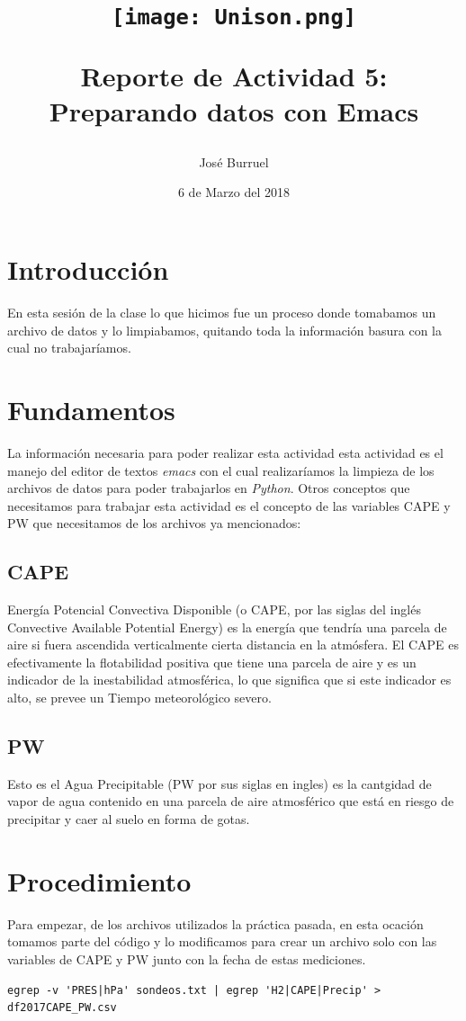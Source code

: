 \documentclass{article}
\title{
        \begin{center}
        \texttt{[image: Unison.png]}
        \end{center}
        \newline
        Reporte de Actividad 5: Preparando datos con Emacs}
\author{José Burruel}
\date{6 de Marzo del 2018}
\begin{document}
\maketitle
\section{Introducción}
En esta sesión de la clase lo que hicimos fue un proceso donde tomabamos un archivo de datos y lo limpiabamos, quitando toda la información basura con la cual no trabajaríamos.

\section{Fundamentos}
La información necesaria para poder realizar esta actividad esta actividad es el manejo del editor de textos \textit{emacs} con el cual realizaríamos la limpieza de los archivos de datos para poder trabajarlos en \textit{Python}.
Otros conceptos que necesitamos para trabajar esta actividad es el concepto de las variables CAPE y PW que necesitamos de los archivos ya mencionados:
\subsection{CAPE}
Energía Potencial Convectiva Disponible (o CAPE, por las siglas del inglés Convective Available Potential Energy) es la energía que tendría una parcela de aire si fuera ascendida verticalmente cierta distancia en la atmósfera.
El CAPE es efectivamente la flotabilidad positiva que tiene una parcela de aire y es un indicador de la inestabilidad atmosférica, lo que significa que si este indicador es alto, se prevee un Tiempo meteorológico severo.
\subsection{PW}
Esto es el Agua Precipitable (PW por sus siglas en ingles) es la cantgidad de vapor de agua contenido en una parcela de aire atmosférico que está en riesgo de precipitar y caer al suelo en forma de gotas.

\section{Procedimiento}
Para empezar, de los archivos utilizados la práctica pasada, en esta ocación tomamos parte del código y lo modificamos para crear un archivo solo con las variables de CAPE y PW junto con la fecha de estas mediciones.
\begin{verbatim}
egrep -v 'PRES|hPa' sondeos.txt | egrep 'H2|CAPE|Precip' > df2017CAPE_PW.csv
\end{verbatim}
\end{document}
